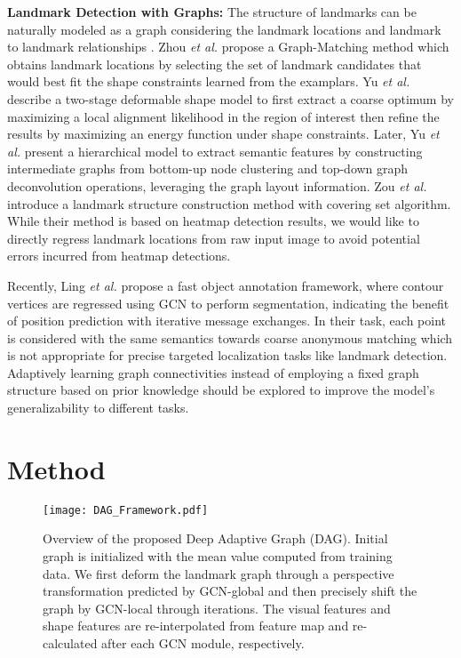\documentclass[runningheads]{llncs}
\begin{document}
\textbf{Landmark Detection with Graphs:} The structure of landmarks can be naturally modeled as a graph considering the landmark locations and landmark to landmark relationships \cite{zhou2013exemplar,yu2019layout,saragih2009face,yu2015face,zhu2015face}. Zhou \textit{et al.} \cite{zhou2013exemplar} propose a Graph-Matching method which obtains landmark locations by selecting the set of landmark candidates that would best fit the shape constraints learned from the examplars. Yu \textit{et al.} \cite{yu2015face} describe a two-stage deformable shape model to first extract a coarse optimum by maximizing a local alignment likelihood in the region of interest then refine the results by maximizing an energy function under shape constraints. Later, Yu \textit{et al.} \cite{yu2019layout} present a hierarchical model to extract semantic features by constructing intermediate graphs from bottom-up node clustering and top-down graph deconvolution operations, leveraging the graph layout information. Zou \textit{et al.} \cite{zoulearning} introduce a landmark structure construction method with covering set algorithm. While their method is based on heatmap detection results, we would like to directly regress landmark locations from raw input image to avoid potential errors incurred from heatmap detections.

Recently, Ling \textit{et al.} \cite{ling2019fast} propose a fast object annotation framework, where contour vertices are regressed using GCN to perform segmentation, indicating the benefit of position prediction with iterative message exchanges. In their task, each point is considered with the same semantics towards coarse anonymous matching which is not appropriate for precise targeted localization tasks like landmark detection. Adaptively learning graph connectivities instead of employing a fixed graph structure based on prior knowledge should be explored to improve the model's generalizability to different tasks.

\section{Method}

\begin{figure*}[t!]
	\centering
	\texttt{[image: DAG\_Framework.pdf]}
\caption{Overview of the proposed Deep Adaptive Graph (DAG). Initial graph is initialized with the mean value computed from training data. We first deform the landmark graph through a perspective transformation predicted by GCN-global and then precisely shift the graph by GCN-local through iterations. The visual features and shape features are re-interpolated from feature map and re-calculated after each GCN module, respectively.}
	\label{fig:framework}
\end{figure*}
\end{document}
